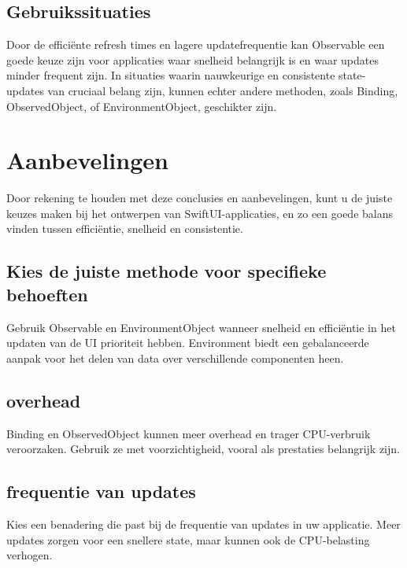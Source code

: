\subsection{Gebruikssituaties}
Door de efficiënte refresh times en lagere updatefrequentie kan Observable een goede keuze zijn voor applicaties waar snelheid belangrijk is en waar updates minder frequent zijn. In situaties waarin nauwkeurige en consistente state-updates van cruciaal belang zijn, kunnen echter andere methoden, zoals Binding, ObservedObject, of EnvironmentObject, geschikter zijn.
 
\newpage
\section{Aanbevelingen}
Door rekening te houden met deze conclusies en aanbevelingen, kunt u de juiste keuzes maken bij het ontwerpen van SwiftUI-applicaties, en zo een goede balans vinden tussen efficiëntie, snelheid en consistentie.
\subsection{Kies de juiste methode voor specifieke behoeften}
Gebruik Observable en EnvironmentObject wanneer snelheid en efficiëntie in het updaten van de UI prioriteit hebben.
Environment biedt een gebalanceerde aanpak voor het delen van data over verschillende componenten heen.
\subsection{overhead}
Binding en ObservedObject kunnen meer overhead en trager CPU-verbruik veroorzaken. Gebruik ze met voorzichtigheid, vooral als prestaties belangrijk zijn.
\subsection{frequentie van updates}
Kies een benadering die past bij de frequentie van updates in uw applicatie. Meer updates zorgen voor een snellere state, maar kunnen ook de CPU-belasting verhogen.





